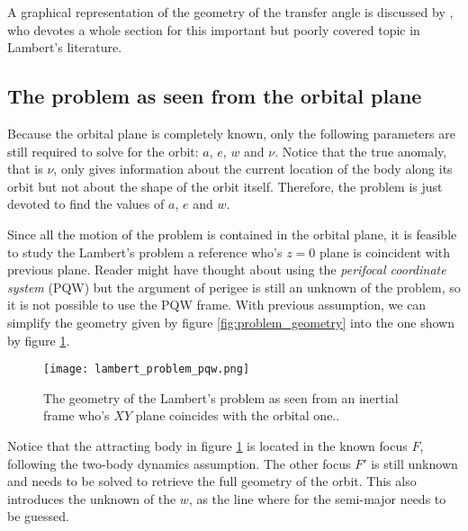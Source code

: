 A graphical representation of the geometry of the transfer angle is discussed by
\cite{der2011}, who devotes a whole section for this important but poorly
covered topic in Lambert's literature.

\subsection{The problem as seen from the orbital plane}

Because the orbital plane is completely known, only the following parameters are
still required to solve for the orbit: $a$, $e$, $w$ and $\nu$. Notice that the
true anomaly, that is $\nu$, only gives information about the current location
of the body along its orbit but not about the shape of the orbit itself.
Therefore, the problem is just devoted to find the values of $a$, $e$ and $w$.

Since all the motion of the problem is contained in the orbital plane, it is
feasible to study the Lambert's problem a reference who's $z=0$ plane is
coincident with previous plane. Reader might have thought about using the
\textit{perifocal coordinate system} (PQW) but the argument of perigee is still
an unknown of the problem, so it is not possible to use the PQW frame. With
previous assumption, we can simplify the geometry given by figure
\ref{fig:problem_geometry} into the one shown by figure
\ref{fig:lambert_problem_pqw}.

\vspace{0.15cm}
\begin{figure}[H]
  \centering
  \texttt{[image: lambert\_problem\_pqw.png]}
  \caption{
    The geometry of the Lambert's problem as seen from an inertial frame who's
    $XY$ plane coincides with the orbital one..
  }
  \label{fig:lambert_problem_pqw}
\end{figure}

Notice that the attracting body in figure \ref{fig:lambert_problem_pqw} is
located in the known focus $F$, following the two-body dynamics assumption. The
other focus $F'$ is still unknown and needs to be solved to retrieve the full
geometry of the orbit. This also introduces the unknown of the $w$, as the line
where for the semi-major needs to be guessed.


